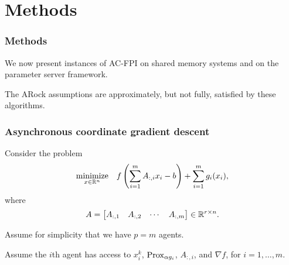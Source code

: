\documentclass[10pt,mathserif]{beamer}
\begin{document}
\section{Methods}



\begin{frame}[fragile]
\frametitle{Methods}
\label{ss:async-methods}
We now present instances of AC-FPI on shared memory systems and on the parameter server framework.
\bigskip

The ARock assumptions are approximately, but not fully, satisfied by these algorithms.

\end{frame}

\begin{frame}[fragile]
\frametitle{Asynchronous coordinate gradient descent}
Consider the problem
\[
\underset{x\in \mathbb{R}^n}{\mbox{minimize}}\quad
  f\left(\sum_{i=1}^{m}A_{:,i}x_i-b\right) + \sum_{i=1}^{m}g_i(x_i),
\]
where
\[
A=\begin{bmatrix}
A_{:,1}&A_{:,2}&\cdots&A_{:,m}
\end{bmatrix}
\in
\mathbb{R}^{r\times n}.
\]
\medskip

Assume for simplicity that we have $p=m$ agents.
\medskip

Assume the $i$th agent has access to $x_i^k$, $\mathrm{Prox}_{\alpha g_i}$, $A_{:,i}$, and $\nabla {f}$, for $i=1,\dots,m$.

\end{frame}
\end{document}
